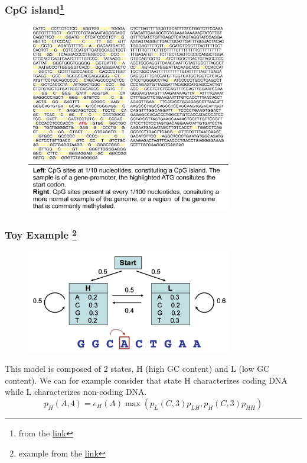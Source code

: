 \documentclass{beamer}
\begin{document}
\begin{frame}
    \frametitle{CpG island\footnote{from the \href{https://commons.wikimedia.org/wiki/File:Cpg_islands.svg}{link}}}
    
    \begin{figure}[T]
        \includegraphics[width=0.8\textwidth]{img/7.png}
        \end{figure}

    \end{frame}
\begin{frame}
    \frametitle{Toy Example \footnote{example from the \href{https://www.cis.upenn.edu/~cis262/notes/Example-Viterbi-DNA.pdf}{link}}}
    
    \begin{figure}[T]
        \includegraphics[width=0.8\textwidth]{img/8.png}
        \end{figure}
        This model is composed of 2 states, H (high GC content) and L (low GC content). We can for example consider that state H characterizes coding DNA while L characterizes non-coding DNA.
        $$
        p_{H}(A, 4)=e_{H}(A) \max \left(p_{L}(C, 3) p_{L H}, p_{H}(C, 3) p_{H H}\right)
        $$
    \end{frame}
\end{document}
